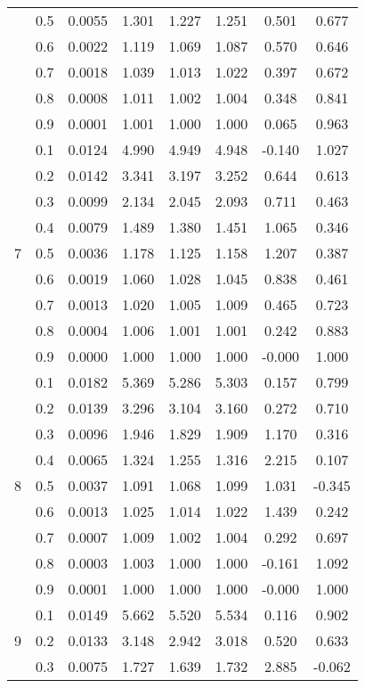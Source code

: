 \documentclass[11pt,a4paper]{report}
\begin{document}
\begin{longtable}{ | c | c || c | c | c | c | c | c | }
 & 0.5 & 0.0055 & 1.301 & 1.227 & 1.251 & 0.501 & 0.677 \\
 & 0.6 & 0.0022 & 1.119 & 1.069 & 1.087 & 0.570 & 0.646 \\
 & 0.7 & 0.0018 & 1.039 & 1.013 & 1.022 & 0.397 & 0.672 \\
 & 0.8 & 0.0008 & 1.011 & 1.002 & 1.004 & 0.348 & 0.841 \\
 & 0.9 & 0.0001 & 1.001 & 1.000 & 1.000 & 0.065 & 0.963 \\
 \hline
\multirow{9}{*}{7} & 0.1 & 0.0124 & 4.990 & 4.949 & 4.948 & -0.140 & 1.027 \\
 & 0.2 & 0.0142 & 3.341 & 3.197 & 3.252 & 0.644 & 0.613 \\
 & 0.3 & 0.0099 & 2.134 & 2.045 & 2.093 & 0.711 & 0.463 \\
 & 0.4 & 0.0079 & 1.489 & 1.380 & 1.451 & 1.065 & 0.346 \\
 & 0.5 & 0.0036 & 1.178 & 1.125 & 1.158 & 1.207 & 0.387 \\
 & 0.6 & 0.0019 & 1.060 & 1.028 & 1.045 & 0.838 & 0.461 \\
 & 0.7 & 0.0013 & 1.020 & 1.005 & 1.009 & 0.465 & 0.723 \\
 & 0.8 & 0.0004 & 1.006 & 1.001 & 1.001 & 0.242 & 0.883 \\
 & 0.9 & 0.0000 & 1.000 & 1.000 & 1.000 & -0.000 & 1.000 \\
 \hline
\multirow{9}{*}{8} & 0.1 & 0.0182 & 5.369 & 5.286 & 5.303 & 0.157 & 0.799 \\
 & 0.2 & 0.0139 & 3.296 & 3.104 & 3.160 & 0.272 & 0.710 \\
 & 0.3 & 0.0096 & 1.946 & 1.829 & 1.909 & 1.170 & 0.316 \\
 & 0.4 & 0.0065 & 1.324 & 1.255 & 1.316 & 2.215 & 0.107 \\
 & 0.5 & 0.0037 & 1.091 & 1.068 & 1.099 & 1.031 & -0.345 \\
 & 0.6 & 0.0013 & 1.025 & 1.014 & 1.022 & 1.439 & 0.242 \\
 & 0.7 & 0.0007 & 1.009 & 1.002 & 1.004 & 0.292 & 0.697 \\
 & 0.8 & 0.0003 & 1.003 & 1.000 & 1.000 & -0.161 & 1.092 \\
 & 0.9 & 0.0001 & 1.000 & 1.000 & 1.000 & -0.000 & 1.000 \\
 \hline
\multirow{9}{*}{9} & 0.1 & 0.0149 & 5.662 & 5.520 & 5.534 & 0.116 & 0.902 \\
 & 0.2 & 0.0133 & 3.148 & 2.942 & 3.018 & 0.520 & 0.633 \\
 & 0.3 & 0.0075 & 1.727 & 1.639 & 1.732 & 2.885 & -0.062 \\

\end{longtable}
\end{document}
